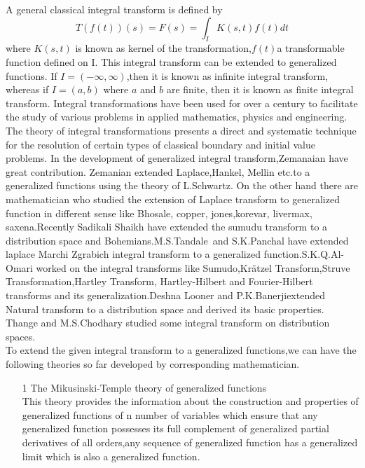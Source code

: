 \begin{large}
A general classical integral transform is defined by \\
\begin{equation}
T(f(t))(s)=F(s)=\int_{I}K(s,t)f(t)dt
\end{equation}
where $K(s,t)$ is known as kernel of the transformation,$f(t)$a transformable function defined on I. This integral transform can be extended to generalized functions. If $ I = (-\infty,\infty)$,then it is known as infinite integral transform, whereas if $ I =(a, b)$ where $a$ and $b$ are finite, then it is known as finite integral transform. Integral transformations have been used for over a century to facilitate the study of various problems in applied mathematics, physics and engineering. The theory of integral transformations presents a direct and systematic technique for the resolution of certain types of classical boundary and initial value problems. In the development of generalized integral transform,Zemanaian have great contribution. Zemanian \cite{R97,R98}extended Laplace,Hankel, Mellin etc.to a generalized functions using the theory of L.Schwartz. On the other hand there are mathematician who studied the extension of Laplace transform to generalized function in different sense like Bhosale\cite{R20,R21}, copper\cite{R29}, jones\cite{R49},korevar\cite{R53}, livermax\cite{R54}, saxena\cite{R67}.Recently Sadikali Shaikh\cite{R68} have extended the sumudu transform to a distribution space and Bohemians.M.S.Tandale\ and S.K.Panchal\cite{R82} have extended laplace Marchi Zgrabich integral transform to a generalized function.S.K.Q.Al-Omari\cite{R75,R76,R77,R78,R79,R80,R81} worked on the integral transforms like Sumudo,Krätzel Transform,Struve Transformation,Hartley Transform, Hartley-Hilbert and Fourier-Hilbert transforms and its generalization.Deshna Looner and P.K.Banerji\cite{R30}extended Natural transform to a distribution space and derived its basic properties. Thange and M.S.Chodhary\cite{R84} studied some integral transform on distribution spaces.\\
To extend the given integral transform to a generalized functions,we can have the following theories so far developed by corresponding mathematician.
\begin{itemize}
\item[1] The Mikusinski-Temple theory of generalized functions\\
This theory provides the information about the construction and properties of generalized functions of n number of variables which ensure that any generalized function possesses its full complement of generalized partial derivatives of all orders,any sequence of generalized function has a generalized limit which is also a generalized function.

\end{itemize}
\end{large}
